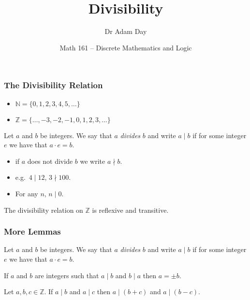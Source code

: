 \documentclass{beamer}
\title{Divisibility}
\date[Math 161]{Math 161 -- Discrete Mathematics and Logic}
\author[Dr Day]{Dr Adam Day}
\newcommand{\Z}{\mathbb{Z}}
\newcommand{\N}{\mathbb{N}}
\begin{document}
\begin{frame}
\titlepage
\end{frame}


\begin{frame}
 \frametitle{The Divisibility Relation}

\begin{itemize}
 \item $\N = \{0,1,2,3,4,5,\ldots\}$
\item $\Z =\{\ldots, -3,-2,-1,0,1,2,3,\ldots\}$
\end{itemize}

\begin{definition}
 Let $a$ and $b$ be integers. We say that $a$ \textit{divides} $b$ and  write $a \mid b$ if for some integer $e$ we have that $a\cdot e= b$. 
\end{definition}

\begin{itemize}
 \item if $a$ does not divide $b$ we write $a \nmid b$. 
 \item e.g.\ $4 \mid 12$, $3 \nmid 100$.
 \item For any $n$, $n \mid 0$. 
 \end{itemize}


\begin{lemma}
The divisibility relation on $\Z$ is reflexive and transitive.
\end{lemma}

\end{frame}



\begin{frame}
\frametitle{More Lemmas}

\begin{definition}
 Let $a$ and $b$ be integers. We say that $a$ \textit{divides} $b$ and  write $a \mid b$ if for some integer $e$ we have that $a\cdot e= b$. 
\end{definition}

\vfill

 \begin{lemma}
 If $a$ and $b$ are integers such that $a \mid b$ and $b \mid a$ then $a= \pm b$. 
\end{lemma}

\vfill



\begin{lemma}
\label{lem: sum}
Let $a,b,c \in \Z$. 
 If $a\mid b$ and $a \mid c$ then $a \mid (b +c)$ and $a\mid (b-c)$.
\end{lemma}
\end{frame}
\end{document}
